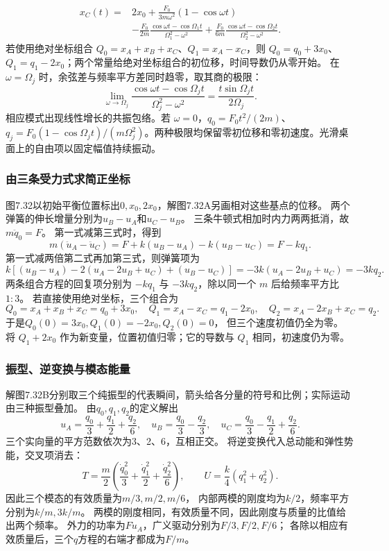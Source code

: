 \documentclass[UTF8,fontset=fandol,a4paper,11pt]{ctexart}
\begin{document}
\[\begin{aligned}\boxed{x_C(t)}={}&2x_0+\frac{F_0}{3m\omega^2}(1-\cos\omega t)\\
&-\frac{F_0}{2m}\frac{\cos\omega t-\cos\Omega_1t}{\Omega_1^2-\omega^2}
+\frac{F_0}{6m}\frac{\cos\omega t-\cos\Omega_2t}{\Omega_2^2-\omega^2}.
\end{aligned}\]
若使用绝对坐标组合 $Q_0=x_A+x_B+x_C$、$Q_1=x_A-x_C$，则 $Q_0=q_0+3x_0$、$Q_1=q_1-2x_0$；两个常量给绝对坐标组合的初位移，时间导数仍从零开始。
在 $\omega=\Omega_j$ 时，余弦差与频率平方差同时趋零，取其商的极限：
\[\lim_{\omega\to\Omega_j}\frac{\cos\omega t-\cos\Omega_jt}{\Omega_j^2-\omega^2}
=\frac{t\sin\Omega_jt}{2\Omega_j}.\]
相应模式出现线性增长的共振包络。若 $\omega=0$，$q_0=F_0t^2/(2m)$、$q_j=F_0(1-\cos\Omega_jt)/(m\Omega_j^2)$。两种极限均保留零初位移和零初速度。光滑桌面上的自由项以固定幅值持续振动。
\subsubsection*{由三条受力式求简正坐标}
图7.32以初始平衡位置标出$0,x_0,2x_0$，解图7.32A另画相对这些基点的位移。
两个弹簧的伸长增量分别为$u_B-u_A$和$u_C-u_B$。
三条牛顿式相加时内力两两抵消，故$m\ddot q_0=F$。
第一式减第三式时，得到
\[
m(\ddot u_A-\ddot u_C)
=F+k(u_B-u_A)-k(u_B-u_C)=F-kq_1.
\]
第一式减两倍第二式再加第三式，则弹簧项为
\[
k[(u_B-u_A)-2(u_A-2u_B+u_C)+(u_B-u_C)]
=-3k(u_A-2u_B+u_C)=-3kq_2.
\]
两条组合方程的回复项分别为 $-kq_1$ 与 $-3kq_2$，除以同一个 $m$ 后给频率平方比 $1:3$。
若直接使用绝对坐标，三个组合为
\[
Q_0=x_A+x_B+x_C=q_0+3x_0,\quad
Q_1=x_A-x_C=q_1-2x_0,\quad
Q_2=x_A-2x_B+x_C=q_2.
\]
于是$Q_0(0)=3x_0,Q_1(0)=-2x_0,Q_2(0)=0$，
但三个速度初值仍全为零。
将 $Q_1+2x_0$ 作为新变量，位置初值归零；它的导数与 $Q_1$ 相同，初速度仍为零。

\subsubsection*{振型、逆变换与模态能量}
解图7.32B分别取三个纯振型的代表瞬间，箭头给各分量的符号和比例；实际运动由三种振型叠加。
由$q_0,q_1,q_2$的定义解出
\[
u_A=\frac{q_0}{3}+\frac{q_1}{2}+\frac{q_2}{6},\quad
u_B=\frac{q_0}{3}-\frac{q_2}{3},\quad
u_C=\frac{q_0}{3}-\frac{q_1}{2}+\frac{q_2}{6}.
\]
三个实向量的平方范数依次为3、2、6，互相正交。
将逆变换代入总动能和弹性势能，交叉项消去：
\[
T=\frac m2\left(\frac{\dot q_0^2}{3}
+\frac{\dot q_1^2}{2}+\frac{\dot q_2^2}{6}\right),\qquad
U=\frac k4(q_1^2+q_2^2).
\]
因此三个模态的有效质量为$m/3,m/2,m/6$，
内部两模的刚度均为$k/2$，频率平方分别为$k/m,3k/m$。
两模的刚度相同，有效质量不同，因此刚度与质量的比值给出两个频率。
外力的功率为$F\dot u_A$，广义驱动分别为$F/3,F/2,F/6$；
各除以相应有效质量后，三个$q$方程的右端才都成为$F/m$。
\end{document}
